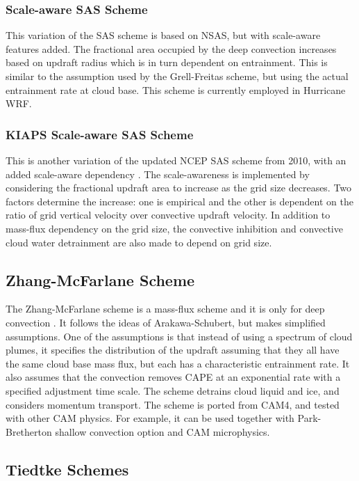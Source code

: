 \subsubsection{Scale-aware SAS Scheme}

This variation of the SAS scheme is based on NSAS, but with scale-aware features added. 
The fractional area occupied by the deep convection increases based on updraft radius 
which is in turn dependent on entrainment. This is similar to the assumption used by 
the Grell-Freitas scheme, but using the actual entrainment rate at cloud base. This scheme 
is currently employed in Hurricane WRF.

\subsubsection{KIAPS Scale-aware SAS Scheme}

This is another variation of the updated NCEP SAS scheme from 2010, 
with an added scale-aware dependency \citep{kwon17}. The scale-awareness is implemented by considering 
the fractional updraft area to increase as the grid size decreases. Two factors determine 
the increase: one is empirical and the other is dependent on the ratio of grid vertical 
velocity over convective updraft velocity. In addition to mass-flux dependency on the grid size, 
the convective inhibition and convective cloud water detrainment are also made to depend on grid size.

\subsection{Zhang-McFarlane Scheme}

The Zhang-McFarlane scheme is a mass-flux scheme and it is only for deep convection \citep{zhang95}. 
It follows the ideas of Arakawa-Schubert, but makes simplified 
assumptions. One of the assumptions is that instead of using a spectrum of cloud plumes, 
it specifies the distribution of the updraft assuming that they all have the same cloud 
base mass flux, but each has a characteristic entrainment rate. It also assumes that the 
convection removes CAPE at an exponential rate with a specified adjustment time scale. 
The scheme detrains cloud liquid and ice, and considers momentum transport. The scheme 
is ported from CAM4, and tested with other CAM physics. For example, it can be 
used together with Park-Bretherton shallow convection option and CAM microphysics.

\subsection{Tiedtke Schemes}


